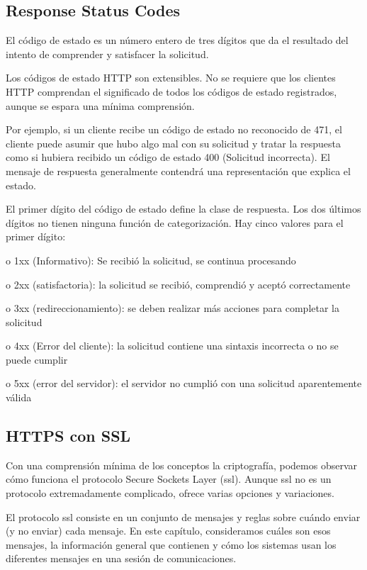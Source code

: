 \subsection{Response Status Codes} 
El código de estado es un número entero de tres dígitos que da el 
resultado del intento de comprender y satisfacer la solicitud.

   Los códigos de estado HTTP son extensibles. No se requiere que los
    clientes HTTP comprendan el significado de todos los códigos de
     estado registrados, aunque se espara una mínima comprensión.

   Por ejemplo, si un cliente recibe un código de estado no reconocido
    de 471, el cliente puede asumir que hubo algo mal con su solicitud
     y tratar la respuesta como si hubiera recibido un código de estado
      400 (Solicitud incorrecta). El mensaje de respuesta generalmente 
      contendrá una representación que explica el estado.

   El primer dígito del código de estado define la clase de respuesta.
    Los dos últimos dígitos no tienen ninguna función de categorización.
     Hay cinco valores para el primer dígito:

   o 1xx (Informativo): Se recibió la solicitud, se continua procesando

   o 2xx (satisfactoria): la solicitud se recibió, comprendió y 
   aceptó correctamente

   o 3xx (redireccionamiento): se deben realizar más acciones para
    completar la solicitud

   o 4xx (Error del cliente): la solicitud contiene una sintaxis
    incorrecta o no se puede cumplir

      o 5xx (error del servidor): el servidor no cumplió con una
       solicitud aparentemente válida


\subsection{HTTPS con SSL} 

Con una comprensión mínima de los conceptos la criptografía, podemos 
observar cómo funciona el protocolo Secure Sockets Layer (ssl). Aunque
 ssl no es un protocolo extremadamente complicado, ofrece varias 
 opciones y variaciones.

El protocolo ssl consiste en un conjunto de mensajes y reglas sobre
 cuándo enviar (y no enviar) cada mensaje. En este capítulo, consideramos 
 cuáles son esos mensajes, la información general que contienen y 
 cómo los sistemas usan los diferentes mensajes en una sesión de
  comunicaciones.


